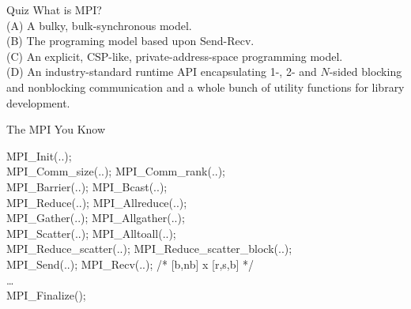 \documentclass[11pt]{beamer}
\begin{document}
\begin{frame}{Quiz} \Large
    What is MPI? \\
    (A) A bulky, bulk-synchronous model. \\
    (B) The programing model based upon Send-Recv. \\
    (C) An explicit, CSP-like, private-address-space programming model. \\
    (D) An industry-standard runtime API encapsulating
        1-, 2- and $N$-sided blocking and nonblocking communication
        and a whole bunch of utility functions for library development. 
\end{frame}

\begin{frame}{The MPI You Know}
    \begin{tt}
        MPI\_Init(..); \\
        MPI\_Comm\_size(..); MPI\_Comm\_rank(..); \\
        MPI\_Barrier(..); MPI\_Bcast(..); \\
        MPI\_Reduce(..); MPI\_Allreduce(..); \\
        MPI\_Gather(..); MPI\_Allgather(..); \\
        MPI\_Scatter(..); MPI\_Alltoall(..); \\
        MPI\_Reduce\_scatter(..); MPI\_Reduce\_scatter\_block(..); \\
        MPI\_Send(..); MPI\_Recv(..); /* [b,nb] x [r,s,b] */ \\
        \ldots \\
        MPI\_Finalize();
    \end{tt}
\end{frame}


\end{document}
